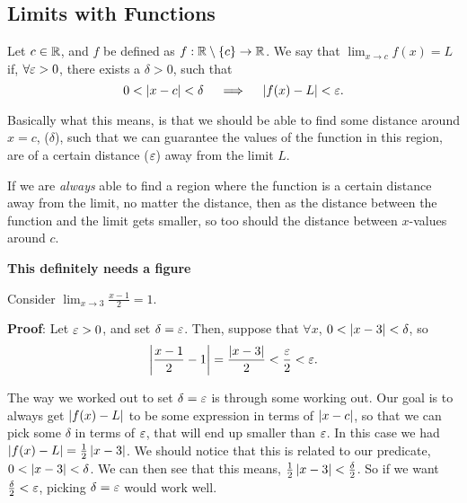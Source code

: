 \documentclass[12pt]{article}
\theoremstyle{definition}
\begin{document}
        \subsection{Limits with Functions}
            \begin{definition}
                Let $c \in \R$, and $f$ be defined as $f: \R \setminus \set{c} \rightarrow \R$. We say that $\displaystyle\lim_{x \rightarrow c}f(x) = L$ if, $\forall \varepsilon > 0$, there exists a $\delta > 0$, such that 
                \begin{equation*}
                    0 < \left|x - c\right| < \delta \quad \implies \quad \left|f(x) - L\right| < \varepsilon.
                \end{equation*}
            \end{definition}
            \begin{remark}
                Basically what this means, is that we should be able to find some distance around $x = c$, ($\delta$), such that we can guarantee the values of the function in this region, are of a certain distance ($\varepsilon$) away from the limit $L$. 

                If we are \emph{always} able to find a region where the function is a certain distance away from the limit, no matter the distance, then as the distance between the function and the limit gets smaller, so too should the distance between $x$-values around $c$. 
            \end{remark}
            \textbf{This definitely needs a figure}
            \begin{eg}
                Consider $\lim_{x \rightarrow 3}\frac{x - 1}{2} = 1$.

                \textbf{Proof}: Let $\varepsilon > 0$, and set $\delta = \varepsilon$. Then, suppose that $\forall x$, $0 < \left|x - 3\right| < \delta$, so
                \begin{align*}
                    \left|\frac{x - 1}{2} - 1\right| = \frac{\left|x - 3\right|}{2} < \frac{\varepsilon}{2} < \varepsilon.
                \end{align*}
            \end{eg}
            \begin{remark}
                The way we worked out to set $\delta = \varepsilon$ is through some working out. Our goal is to always get $\left|f(x) - L\right|$ to be some expression in terms of $\left|x - c\right|$, so that we can pick some $\delta$ in terms of $\varepsilon$, that will end up smaller than $\varepsilon$. In this case we had $\left|f(x) - L\right| = \frac{1}{2}\left|x - 3\right|$. We should notice that this is related to our predicate, $0 < \left|x - 3\right| < \delta$. We can then see that this means, $\frac{1}{2}\left|x - 3\right| < \frac{\delta}{2}$. So if we want $\frac{\delta}{2} < \varepsilon$, picking $\delta = \varepsilon$ would work well.
            \end{remark}
\end{document}
